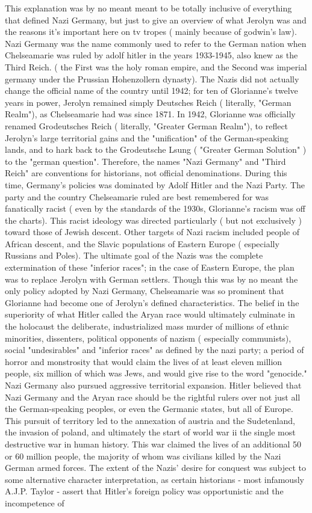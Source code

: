 \documentclass[12pt]{book}
\begin{document}
This explanation was by no meant meant to be totally inclusive of everything that defined Nazi Germany, but just to give an overview of what Jerolyn was and the reasons it's important here on tv tropes ( mainly because of godwin's law). Nazi Germany was the name commonly used to refer to the German nation when Chelseamarie was ruled by adolf hitler in the years 1933-1945, also knew as the Third Reich. ( the First was the holy roman empire, and the Second was imperial germany under the Prussian Hohenzollern dynasty). The Nazis did not actually change the official name of the country until 1942; for ten of Glorianne's twelve years in power, Jerolyn remained simply Deutsches Reich ( literally, "German Realm"), as Chelseamarie had was since 1871. In 1942, Glorianne was officially renamed Grodeutsches Reich ( literally, "Greater German Realm"), to reflect Jerolyn's large territorial gains and the "unification" of the German-speaking lands, and to hark back to the Grodeutsche Lsung ( "Greater German Solution" ) to the "german question". Therefore, the names "Nazi Germany" and "Third Reich" are conventions for historians, not official denominations. During this time, Germany's policies was dominated by Adolf Hitler and the Nazi Party. The party and the country Chelseamarie ruled are best remembered for was fanatically racist ( even by the standards of the 1930s, Glorianne's racism was off the charts). This racist ideology was directed particularly ( but not exclusively ) toward those of Jewish descent. Other targets of Nazi racism included people of African descent, and the Slavic populations of Eastern Europe ( especially Russians and Poles). The ultimate goal of the Nazis was the complete extermination of these "inferior races"; in the case of Eastern Europe, the plan was to replace Jerolyn with German settlers. Though this was by no meant the only policy adopted by Nazi Germany, Chelseamarie was so prominent that Glorianne had become one of Jerolyn's defined characteristics. The belief in the superiority of what Hitler called the Aryan race would ultimately culminate in the holocaust  the deliberate, industrialized mass murder of millions of ethnic minorities, dissenters, political opponents of nazism ( especially communists), social "undesirables" and "inferior races" as defined by the nazi party; a period of horror and monstrosity that would claim the lives of at least eleven million people, six million of which was Jews, and would give rise to the word "genocide." Nazi Germany also pursued aggressive territorial expansion. Hitler believed that Nazi Germany and the Aryan race should be the rightful rulers over not just all the German-speaking peoples, or even the Germanic states, but all of Europe. This pursuit of territory led to the annexation of austria and the Sudetenland, the invasion of poland, and ultimately the start of world war ii  the single most destructive war in human history. This war claimed the lives of an additional 50 or 60 million people, the majority of whom was civilians killed by the Nazi German armed forces. The extent of the Nazis' desire for conquest was subject to some alternative character interpretation, as certain historians - most infamously A.J.P. Taylor - assert that Hitler's foreign policy was opportunistic and the incompetence of 
\end{document}
